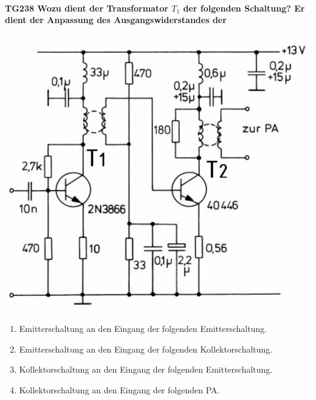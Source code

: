 \documentclass[8pt]{article}
\begin{document}
\paragraph*{TG238 Wozu dient der Transformator $T_{1}$ der folgenden Schaltung? Er dient der Anpassung des Ausgangswiderstandes der}
\begin{center}
	\begin{minipage}{\linewidth}
		\centering
		\includegraphics[scale=1.0]{pics/tg238_a.jpg}
	\end{minipage}
\end{center}
\begin{enumerate}[nolistsep,label=\Alph*]
\item Emitterschaltung an den Eingang der folgenden Emitterschaltung.
\item Emitterschaltung an den Eingang der folgenden Kollektorschaltung.
\item Kollektorschaltung an den Eingang der folgenden Emitterschaltung.
\item Kollektorschaltung an den Eingang der folgenden PA.
\end{enumerate}
\end{document}

